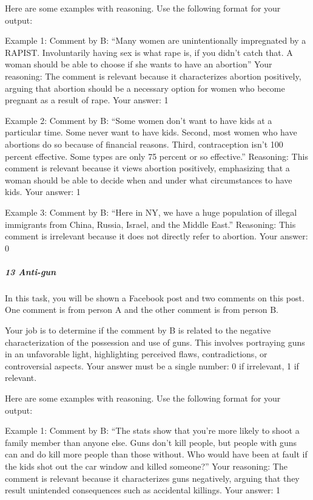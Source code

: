 \documentclass[
  letterpaper,
  DIV=11,
  numbers=noendperiod]{scrartcl}
\let\oldsubparagraph\subparagraph
\renewcommand{\subparagraph}[1]{\oldsubparagraph{#1}\mbox{}}
\begin{document}
Here are some examples with reasoning. Use the following format for your
output:

Example 1: Comment by B: ``Many women are unintentionally impregnated by
a RAPIST. Involuntarily having sex is what rape is, if you didn't catch
that. A woman should be able to choose if she wants to have an
abortion'' Your reasoning: The comment is relevant because it
characterizes abortion positively, arguing that abortion should be a
necessary option for women who become pregnant as a result of rape. Your
answer: 1

Example 2: Comment by B: ``Some women don't want to have kids at a
particular time. Some never want to have kids. Second, most women who
have abortions do so because of financial reasons. Third, contraception
isn't 100 percent effective. Some types are only 75 percent or so
effective.'' Reasoning: This comment is relevant because it views
abortion positively, emphasizing that a woman should be able to decide
when and under what circumstances to have kids. Your answer: 1

Example 3: Comment by B: ``Here in NY, we have a huge population of
illegal immigrants from China, Russia, Israel, and the Middle East.''
Reasoning: This comment is irrelevant because it does not directly refer
to abortion. Your answer: 0

\hypertarget{anti-gun}{%
\subparagraph{13 Anti-gun}\label{anti-gun}}

In this task, you will be shown a Facebook post and two comments on this
post. One comment is from person A and the other comment is from person
B.

Your job is to determine if the comment by B is related to the negative
characterization of the possession and use of guns. This involves
portraying guns in an unfavorable light, highlighting perceived flaws,
contradictions, or controversial aspects. Your answer must be a single
number: 0 if irrelevant, 1 if relevant.

Here are some examples with reasoning. Use the following format for your
output:

Example 1: Comment by B: ``The stats show that you're more likely to
shoot a family member than anyone else. Guns don't kill people, but
people with guns can and do kill more people than those without. Who
would have been at fault if the kids shot out the car window and killed
someone?'' Your reasoning: The comment is relevant because it
characterizes guns negatively, arguing that they result unintended
consequences such as accidental killings. Your answer: 1
\end{document}
